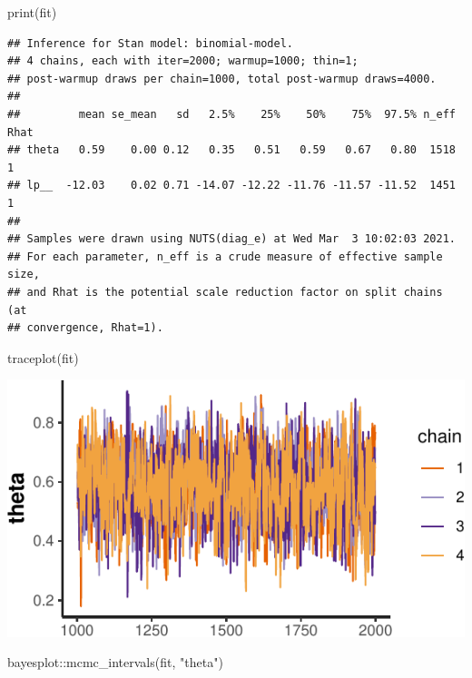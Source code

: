 \documentclass[]{tufte-handout}
\newenvironment{Shaded}{}{}
\newcommand{\FunctionTok}[1]{\textcolor[rgb]{0.02,0.16,0.49}{#1}}
\newcommand{\NormalTok}[1]{#1}
\newcommand{\SpecialCharTok}[1]{\textcolor[rgb]{0.25,0.44,0.63}{#1}}
\newcommand{\StringTok}[1]{\textcolor[rgb]{0.25,0.44,0.63}{#1}}
\begin{document}
\begin{Shaded}
\begin{Highlighting}[]
\FunctionTok{print}\NormalTok{(fit)}
\end{Highlighting}
\end{Shaded}

\begin{verbatim}
## Inference for Stan model: binomial-model.
## 4 chains, each with iter=2000; warmup=1000; thin=1; 
## post-warmup draws per chain=1000, total post-warmup draws=4000.
## 
##         mean se_mean   sd   2.5%    25%    50%    75%  97.5% n_eff Rhat
## theta   0.59    0.00 0.12   0.35   0.51   0.59   0.67   0.80  1518    1
## lp__  -12.03    0.02 0.71 -14.07 -12.22 -11.76 -11.57 -11.52  1451    1
## 
## Samples were drawn using NUTS(diag_e) at Wed Mar  3 10:02:03 2021.
## For each parameter, n_eff is a crude measure of effective sample size,
## and Rhat is the potential scale reduction factor on split chains (at 
## convergence, Rhat=1).
\end{verbatim}

\begin{Shaded}
\begin{Highlighting}[]
\FunctionTok{traceplot}\NormalTok{(fit)}
\end{Highlighting}
\end{Shaded}

\includegraphics{01-intro-bayesian-stats_files/figure-latex/unnamed-chunk-28-1}

\begin{Shaded}
\begin{Highlighting}[]
\NormalTok{bayesplot}\SpecialCharTok{::}\FunctionTok{mcmc\_intervals}\NormalTok{(fit, }\StringTok{"theta"}\NormalTok{)}
\end{Highlighting}
\end{Shaded}
\end{document}
